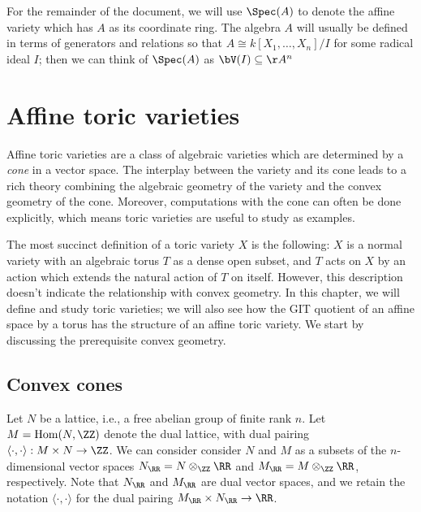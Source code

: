 \documentclass[12pt]{amsart}
\theoremstyle{plain}
\begin{document}
For the remainder of the document, we will use $\Spec(A)$ to denote the affine variety which has $A$ as its coordinate ring.
The algebra $A$ will usually be defined in terms of generators and relations so that $A \cong k[X_1, \ldots, X_n] / I$ for some radical ideal $I$; 
then we can think of $\Spec(A)$ as $\bV(I) \subseteq \AA^n$

\newpage
\section{Affine toric varieties}\label{affinetoricvarieties}
Affine toric varieties are a class of algebraic varieties which are determined by a \emph{cone} in a vector space.
The interplay between the variety and its cone leads to a rich theory combining the algebraic geometry of the variety and the convex geometry of the cone.
Moreover, computations with the cone can often be done explicitly, which means toric varieties are useful to study as examples.

The most succinct definition of a toric variety $X$ is the following:
$X$ is a normal variety with an algebraic torus $T$ as a dense open subset, and $T$ acts on $X$ by an action which extends the natural action of $T$ on itself.
However, this description doesn't indicate the relationship with convex geometry.
In this chapter, we will define and study toric varieties; we will also see how the GIT quotient of an affine space by a torus has the structure of an affine toric variety.
We start by discussing the prerequisite convex geometry.

\subsection{Convex cones}
Let $N$ be a lattice, i.e., a free abelian group of finite rank $n$.
Let $M = \mathrm{Hom}(N, \ZZ)$ denote the dual lattice, with dual pairing $\langle \cdot, \cdot \rangle : M \times N \to \ZZ$.
We can consider consider $N$ and $M$ as a subsets of the $n$-dimensional vector spaces
$N_\RR = N \otimes_\ZZ \RR$ and $M_\RR = M \otimes_\ZZ \RR$, respectively.
Note that $N_\RR$ and $M_\RR$ are dual vector spaces, and we retain the notation $\langle \cdot, \cdot \rangle$ for the dual pairing $M_\RR \times N_\RR \to \RR$.
\end{document}
